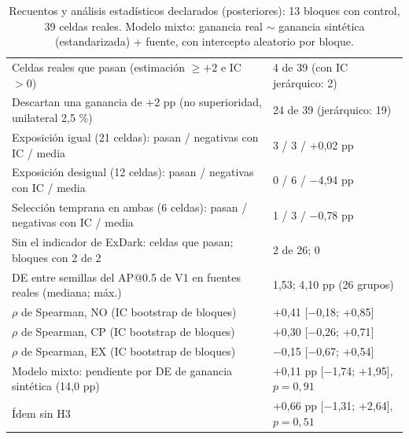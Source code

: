 \begin{table}[H]\centering\scriptsize
\caption{Recuentos y análisis estadísticos declarados (posteriores): 13 bloques con control, 39 celdas reales. Modelo mixto: ganancia real $\sim$ ganancia sintética (estandarizada) + fuente, con intercepto aleatorio por bloque.}\label{tab:s-estad}
\begin{tabular}{@{}p{5.0cm} p{2.9cm}@{}}\toprule
Celdas reales que pasan (estimación $\geq+2$ e IC $>0$) & 4 de 39 (con IC jerárquico: 2) \\
Descartan una ganancia de +2 pp (no superioridad, unilateral 2,5 \%) & 24 de 39 (jerárquico: 19) \\
Exposición igual (21 celdas): pasan / negativas con IC / media & 3 / 3 / +0{,}02 pp \\
Exposición desigual (12 celdas): pasan / negativas con IC / media & 0 / 6 / $-$4{,}94 pp \\
Selección temprana en ambas (6 celdas): pasan / negativas con IC / media & 1 / 3 / $-$0{,}78 pp \\
Sin el indicador de ExDark: celdas que pasan; bloques con 2 de 2 & 2 de 26; 0 \\
DE entre semillas del AP@0.5 de V1 en fuentes reales (mediana; máx.) & 1{,}53; 4{,}10 pp (26 grupos) \\
$\rho$ de Spearman, NO (IC bootstrap de bloques) & +0{,}41 [$-$0{,}18; +0{,}85] \\
$\rho$ de Spearman, CP (IC bootstrap de bloques) & +0{,}30 [$-$0{,}26; +0{,}71] \\
$\rho$ de Spearman, EX (IC bootstrap de bloques) & $-$0{,}15 [$-$0{,}67; +0{,}54] \\
Modelo mixto: pendiente por DE de ganancia sintética (14{,}0 pp) & +0{,}11 pp [$-$1{,}74; +1{,}95], $p=0{,}91$ \\
Ídem sin H3 & +0{,}66 pp [$-$1{,}31; +2{,}64], $p=0{,}51$ \\
\bottomrule\end{tabular}\end{table}
